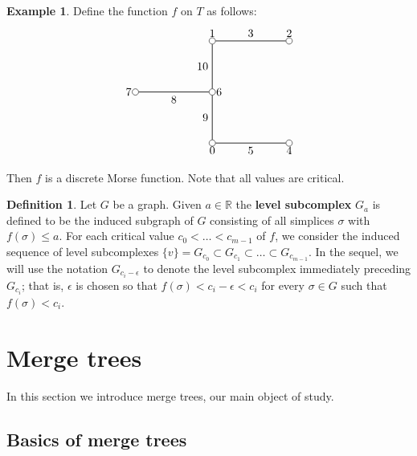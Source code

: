 \documentclass{article}
\theoremstyle{definition}
\newcommand{\ep}    {\epsilon}
\newtheorem{defn}[thm]  {Definition}
\newtheorem{ex}[thm]    {Example}
\begin{document}
\begin{ex}\label{ex: first dmf}  Define the function $f$ on $T$ as follows:
$$
\begin{tikzpicture}[scale=.8]

\node[inner sep=2pt, circle] (0) at (0,0) [draw] {};
\node[inner sep=2pt, circle] (1) at (3,0) [draw] {};
\node[inner sep=2pt, circle] (2) at (-3,2) [draw] {};
\node[inner sep=2pt, circle] (3) at (0,2) [draw] {};
\node[inner sep=2pt, circle] (4) at (0,4) [draw] {};
\node[inner sep=2pt, circle] (5) at (3,4) [draw] {};


\path[style=semithick] (0) edge node[anchor=north]{{$5$}}(1);
\path[style=semithick] (0) edge node[anchor=east]{{$9$}}(3);
\path[style=semithick] (2) edge node[anchor=north]{{$8$}}(3);
\path[style=semithick] (3) edge node[anchor=east]{{$10$}}(4);
\path[style=semithick] (4) edge node[anchor=south]{{$3$}}(5);


\node[anchor = north]  at (0) {{$0$}};
\node[anchor = north]  at (1) {{$4$}};
\node[anchor = east]  at (2) {{$7$}};
\node[anchor = west]  at (3) {{$6$}};
\node[anchor = south]  at (4) {{$1$}};
\node[anchor = south]  at (5) {{$2$}};
\end{tikzpicture}
$$

\noindent Then $f$ is a discrete Morse function.  Note that all values are critical.
\end{ex}


\begin{defn}\label{level} Let $G$ be a graph.  Given $a \in \mathbb R$ the \textbf{level subcomplex} $G_a$ is defined to be the induced subgraph of $G$ consisting of all simplices $\sigma$ with $f(\sigma) \leq a$.  For each critical value $c_0< \ldots < c_{m-1}$ of $f$, we consider the induced sequence of level subcomplexes $\{v\}=G_{c_0} \subset G_{c_1}\subset \ldots \subset G_{c_{m-1}}$.  In the sequel, we will use the notation $G_{c_i-\ep}$ to denote the level subcomplex immediately preceding $G_{c_i}$; that is, $\ep$ is chosen so that $f(\sigma)<c_i-\ep<c_i$ for every $\sigma\in G$ such that $f(\sigma)<c_i$.
\end{defn}


\section{Merge trees}

In this section we introduce merge trees, our main object of study.

\subsection{Basics of merge trees}
\end{document}
